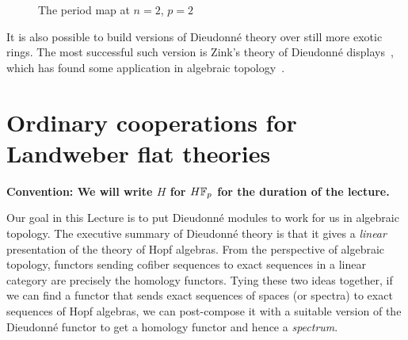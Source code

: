 \begin{figure}
\begin{center}
\end{center}
\caption{The period map at $n = 2$, $p = 2$}\label{PeriodMapFigure}
\end{figure}

\begin{remark}
It is also possible to build versions of Dieudonn\'e theory over still more exotic rings.  The most successful such version is Zink's theory of Dieudonn\'e displays~\cite{ZinkDisplays}, which has found some application in algebraic topology~\cite{LawsonDisplays}.
\end{remark}









\section{Ordinary cooperations for Landweber flat theories}\label{LEFTCooperations}

\begin{center}
\textbf{Convention: We will write $H$ for $\HFp$ for the duration of the lecture.}
\end{center}

Our goal in this Lecture is to put Dieudonn\'e modules to work for us in algebraic topology.  The executive summary of Dieudonn\'e theory is that it gives a \emph{linear} presentation of the theory of Hopf algebras.  From the perspective of algebraic topology, functors sending cofiber sequences to exact sequences in a linear category are precisely the homology functors.  Tying these two ideas together, if we can find a functor that sends exact sequences of spaces (or spectra) to exact sequences of Hopf algebras, we can post-compose it with a suitable version of the Dieudonn\'e functor to get a homology functor and hence a \emph{spectrum}.

